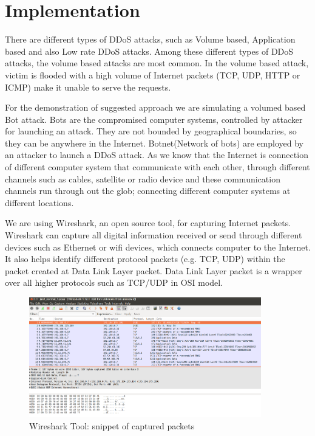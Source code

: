 \documentclass[10pt,oneside,a4paper]{article}
\begin{document}
\section{Implementation}

There are different types of DDoS attacks, such as Volume based, Application based and also Low rate DDoS attacks. Among these different types of DDoS attacks, the volume based attacks are most common. In the volume based attack, victim is flooded with a high volume of Internet packets (TCP, UDP, HTTP or ICMP) make it unable to serve the requests.

For the demonstration of suggested approach we are simulating a volumed based Bot attack. Bots are the compromised computer systems, controlled by attacker for launching an attack. They are not bounded by geographical boundaries, so they can be anywhere in the Internet. Botnet(Network  of bots) are employed by an attacker to launch a DDoS attack. As we know that the Internet is connection of different computer system that communicate with each other, through different channels such as cables, satellite or radio device and these communication channels run through out the glob; connecting different computer systems at different locations.

We are using Wireshark, an open source tool, for capturing Internet packets. Wireshark can capture all digital information received or send through different devices such as Ethernet or wifi devices, which connects computer to the Internet. It also helps identify different protocol packets (e.g. TCP, UDP) within the packet created at Data Link Layer packet. Data Link Layer packet is a wrapper over all higher protocols such as TCP/UDP in OSI model.\par

\begin{figure}[H]
\centering
\includegraphics[width=0.90\textwidth]{Wireshark_Tools.png}
\caption{Wireshark Tool: snippet of captured packets} \label{fig:wireshark}
\end{figure}
\end{document}
